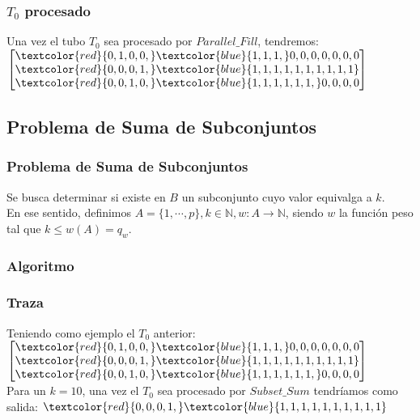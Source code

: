 \documentclass[12pt]{beamer}
\begin{document}
 \begin{frame}
     \frametitle{$T_0$ procesado}
     Una vez el tubo $T_0$ sea procesado por $Parallel\_Fill$, tendremos: \\
    $
        \begin{bmatrix}
            \textcolor{red}{0, 1, 0, 0,} \textcolor{blue}{1, 1, 1,} 0, 0, 0, 0, 0, 0, 0 \\
            \textcolor{red}{0, 0, 0, 1,} \textcolor{blue}{1, 1, 1, 1, 1, 1, 1, 1, 1, 1} \\
            \textcolor{red}{0, 0, 1, 0,} \textcolor{blue}{1, 1, 1, 1, 1, 1,} 0, 0, 0, 0
        \end{bmatrix}
    $
 \end{frame}
 \begin{frame}
     \section{Problema de Suma de Subconjuntos}
     \frametitle{Problema de Suma de Subconjuntos}
     Se busca determinar si existe en $B$ un subconjunto cuyo valor equivalga a $k$.\\En ese sentido, definimos $A=\{1,\cdots,p\}, k\in\mathbb{N}, w:A\rightarrow\mathbb{N}$, siendo $w$ la función peso tal que $k\leq w(A)=q_w$.
 \end{frame}
 \begin{frame}
     \frametitle{Algoritmo}
     \begin{algorithmic}[1]
        \EndProcedure
    \end{algorithmic}
 \end{frame}
 \begin{frame}
     \frametitle{Traza}
     Teniendo como ejemplo el $T_0$ anterior:
     $
        \begin{bmatrix}
            \textcolor{red}{0, 1, 0, 0,} \textcolor{blue}{1, 1, 1,} 0, 0, 0, 0, 0, 0, 0 \\
            \textcolor{red}{0, 0, 0, 1,} \textcolor{blue}{1, 1, 1, 1, 1, 1, 1, 1, 1, 1} \\
            \textcolor{red}{0, 0, 1, 0,} \textcolor{blue}{1, 1, 1, 1, 1, 1,} 0, 0, 0, 0
        \end{bmatrix}
    $
    \\
    Para un $k=10$, una vez el $T_0$ sea procesado por $Subset\_Sum$ tendríamos como salida: $\textcolor{red}{0, 0, 0, 1,} \textcolor{blue}{1, 1, 1, 1, 1, 1, 1, 1, 1, 1}$
 \end{frame}
\end{document}
